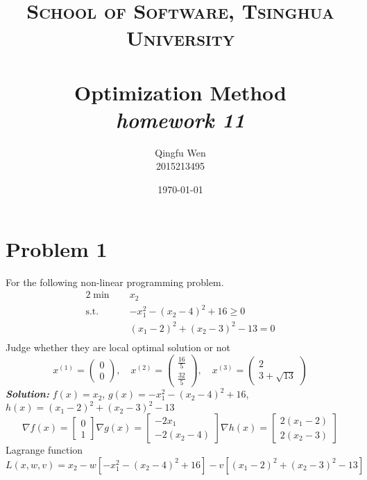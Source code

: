 \documentclass[paper=a4, fontsize=11pt]{scrartcl} %
\title{	
\normalfont \normalsize
\textsc{School of Software, Tsinghua University} \\ [25pt] %
\horrule{0.5pt} \\[0.4cm] %
\huge Optimization Method\\ %
\LARGE\textit{homework 11}
\horrule{2pt} \\[0.5cm] %
}
\author{Qingfu Wen \\ \normalsize 2015213495} %
\date{\normalsize\today} %
\numberwithin{equation}{section} %
\numberwithin{figure}{section} %
\numberwithin{table}{section} %
\begin{document}
\maketitle %
\tableofcontents
\newpage
\section{Problem 1}
For the following non-linear programming problem.
\begin{alignat}{2}          \nonumber
\min\quad & x_2\\    \nonumber
\mbox{s.t.}\quad            \nonumber
& -x_1^2-(x_2-4)^2+16 \geq 0\\        \nonumber
& (x_1-2)^2+(x_2-3)^2-13 = 0\\         \nonumber
\end{alignat}
Judge whether they are local optimal solution or not
\begin{equation}
x^{(1)}=\begin{pmatrix} 0 \\ 0\end{pmatrix}, \quad
x^{(2)}=\begin{pmatrix} \frac{16}{5} \\ \frac{32}{5} \end{pmatrix}, \quad
x^{(3)}=\begin{pmatrix} 2 \\ 3+\sqrt{13}\end{pmatrix} \nonumber
\end{equation}
\emph{\textbf{Solution:}}
$f(x)=x_2$, $g(x)=-x_1^2-(x_2-4)^2+16$, $h(x)=(x_1-2)^2+(x_2-3)^2-13$\\
\begin{equation} \nonumber
\nabla f(x) = \begin{bmatrix}0 \\ 1\end{bmatrix}
\nabla g(x) = \begin{bmatrix}-2x_1 \\ -2(x_2-4)\end{bmatrix}
\nabla h(x) = \begin{bmatrix}2(x_1-2) \\ 2(x_2-3)\end{bmatrix}
\end{equation}
Lagrange function $L(x,w,v)=x_2-w[-x_1^2-(x_2-4)^2+16]-v[(x_1-2)^2+(x_2-3)^2-13]$\\
\end{document}
